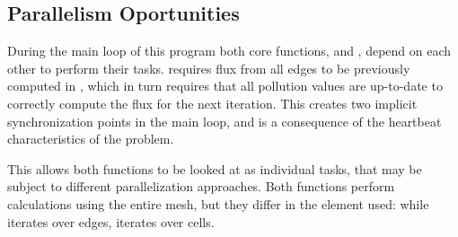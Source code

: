 \subsection{Parallelism Oportunities}

During the main loop of this program both core functions, \computeflux and \update, depend on each other to perform their tasks. \update requires flux from all edges to be previously computed in \computeflux, which in turn requires that all pollution values are up-to-date to correctly compute the flux for the next iteration. This creates two implicit synchronization points in the main loop, and is a consequence of the heartbeat characteristics of the problem.

This allows both functions to be looked at as individual tasks, that may be subject to different parallelization approaches. Both functions perform calculations using the entire mesh, but they differ in the element used: while \computeflux iterates over edges, \update iterates over cells.

